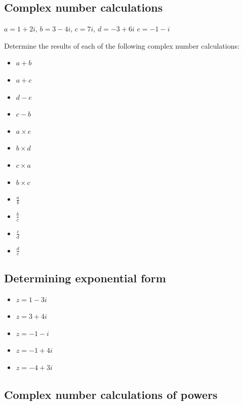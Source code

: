 \documentclass[
]{book}
\providecommand{\tightlist}{%
  \setlength{\itemsep}{0pt}\setlength{\parskip}{0pt}}
\begin{document}
\hypertarget{complex-number-calculations}{%
\subsection{Complex number calculations}\label{complex-number-calculations}}

\(a=1+2i\), \(b=3-4i\), \(c=7i\), \(d = -3+6i\) \(e = -1-i\)

Determine the results of each of the following complex number calculations:

\begin{itemize}
\tightlist
\item
  \(a+b\)
\item
  \(a+ c\)
\item
  \(d-e\)
\item
  \(c-b\)
\item
  \(a \times e\)
\item
  \(b \times d\)
\item
  \(c \times a\)
\item
  \(b \times c\)
\item
  \(\frac{a}{b}\)
\item
  \(\frac{b}{c}\)
\item
  \(\frac{c}{d}\)
\item
  \(\frac{d}{e}\)
\end{itemize}

\hypertarget{determining-exponential-form}{%
\subsection{Determining exponential form}\label{determining-exponential-form}}

\begin{itemize}
\tightlist
\item
  \(z = 1-3i\)
\item
  \(z = 3+4i\)
\item
  \(z = -1-i\)
\item
  \(z = -1+4i\)
\item
  \(z = -4+3i\)
\end{itemize}

\hypertarget{complex-number-calculations-of-powers}{%
\subsection{Complex number calculations of powers}\label{complex-number-calculations-of-powers}}
\end{document}
